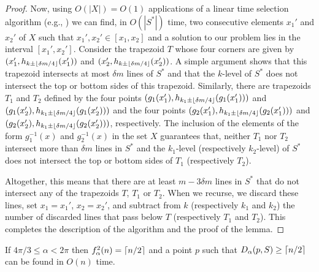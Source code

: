 \documentclass{dmtcs}
\begin{document}
\begin{proof}
Now, using $O(|X|)=O(1)$ applications of a linear time selection
algorithm (e.g., \cite{bea73}) we can 
find, in $O(|S^*|)$ time, two consecutive elements $x_1'$
and $x_2'$ of $X$ such that $x_1',x_2'\in[x_1,x_2]$ and a solution to our
problem lies in the interval $[x_1',x_2']$.  Consider the trapezoid
$T$ whose four corners are given by $(x_1',h_{k\pm\left\lfloor \delta
m/4 \right\rfloor}(x_1'))$ and $(x_2',h_{k\pm\left\lfloor \delta m/4 \right\rfloor}(x_2'))$.  A simple
argument \cite{lms94} shows that this trapezoid intersects at
most $\delta m$ lines of $S^*$ and that the $k$-level of $S^*$ does
not intersect the top or bottom sides of this trapezoid.  Similarly,
there are trapezoids $T_1$ and $T_2$ defined by the four points 
$(g_1(x_1'),h_{k_1\pm\left\lfloor \delta m/4 \right\rfloor}(g_1(x_1')))$ and
$(g_1(x_2'),h_{k_1\pm\left\lfloor \delta m/4 \right\rfloor}(g_1(x_2')))$ and the four
points
$(g_2(x_1'),h_{k_1\pm\left\lfloor \delta m/4 \right\rfloor}(g_2(x_1')))$ and
$(g_2(x_2'),h_{k_1\pm\left\lfloor \delta m/4 \right\rfloor}(g_2(x_2')))$, respectively.
The inclusion of the elements of the form $g_1^{-1}(x)$ and
$g_2^{-1}(x)$ in the set $X$ guarantees that, neither $T_1$ 
nor $T_2$ intersect more than $\delta m$ lines in $S^*$
and the $k_1$-level (respectively $k_2$-level) of $S^*$ does not
intersect the top or bottom sides of $T_1$ (respectively $T_2$).

Altogether, this means that there are at least $m-3\delta m$ lines in
$S^*$ that do not intersect any of the trapezoids $T$, $T_1$ or $T_2$.
When we recurse, we discard these lines, set $x_1=x_1'$, $x_2=x_2'$,
and subtract from $k$ (respectively $k_1$ and $k_2$) the number of
discarded lines that pass below $T$ (respectively $T_1$ and $T_2$).
This completes the description of the algorithm and the proof of the
lemma.
\end{proof}

\begin{lem}
If $4\pi/3\le \alpha < 2\pi$ then $f^2_\alpha(n) = \left\lceil n/2 \right\rceil$ and a point
$p$ such that $D_\alpha(p,S)\ge \left\lceil n/2 \right\rceil$ can be found in $O(n)$ time.
\end{lem}
\end{document}
